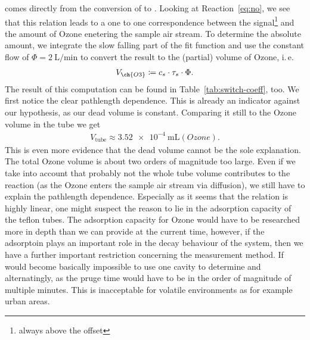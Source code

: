 comes directly from the conversion of  to . Looking at
Reaction~\eqref{eq:no}, we see that this relation leads to a one to
one correspondence between the  signal\footnote{always above
  the offset} and the amount of Ozone enetering the sample air
stream. To determine the absolute amount, we integrate the slow
falling part of the fit function and use the constant flow of $\Phi =
\SI{2}{\liter\per\minute}$ to convert the result to the (partial)
volume of Ozone, i.\,e.
\begin{align*}
  V_{\ch{O3}} \coloneqq  c_s \cdot \tau_s \cdot \Phi.
\end{align*}
The result of this computation can be found in
Table~\ref{tab:switch-coeff}, too. We first notice the clear
pathlength dependence. This is already an indicator against our
hypothesis, as our dead volume is constant. Comparing it still to the
Ozone volume in the tube we get
\begin{align*}
  V_{\text{tube}} \approx \SI{3.52e-4}{\milli\liter(Ozone)}.
\end{align*}
This is even more evidence that the dead volume cannot be the sole
explanation. The total Ozone volume is about two orders of magnitude
too large. Even if we take into account that probably not the whole
tube volume contributes to the reaction (as the Ozone enters the
sample air stream via diffusion), we still have to explain the
pathlength dependence. Especially as it seems that the relation is
highly linear, one might suspect the reason to lie in the adsorption
capacity of the teflon tubes. The adsorption capacity for Ozone would
have to be researched more in depth than we can provide at the current
time, however, if the adsorptoin plays an important role in the decay
behaviour of the system, then we have a further important restriction
concerning the measurement method. If would become basically
impossible to use one cavity to determine  and 
alternatingly, as the pruge time would have to be in the order of
magnitude of multiple minutes. This is inacceptable for volatile
environments as for example urban areas.

